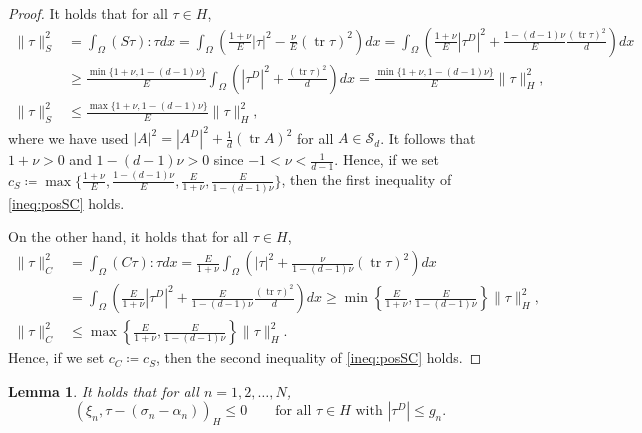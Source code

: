 \documentclass[11pt, a4paper]{article}
\newtheorem{Lem}[Th]{Lemma}
\newcommand{\Sym}{{\mathcal S}}
\newcommand{\tr}{\operatorname{tr}}
\newcommand{\defeq}{\coloneqq}
\newcommand{\into}{\int_\Omega}
\newcommand{\Hs}{{H}}
\begin{document}
\begin{proof}
    It holds that for all $\tau\in\Hs$, 
    \begin{align*}
        \|\tau\|_S^2
        &= \into (S\tau):\tau dx 
        = \into \left(\frac{1+\nu}{E}|\tau|^2 - \frac{\nu}{E}(\tr \tau)^2\right) dx
        = \into \left(\frac{1+\nu}{E}|\tau^D|^2 + \frac{1-(d-1)\nu}{E}\frac{(\tr \tau)^2}{d}\right) dx\\
        &\ge \frac{\min\{1+\nu,1-(d-1)\nu\}}{E}\into \left(|\tau^D|^2 + \frac{(\tr \tau)^2}{d}\right) dx
        = \frac{\min\{1+\nu,1-(d-1)\nu\}}{E}\|\tau\|_\Hs^2,\\
        \|\tau\|_S^2
        &\le \frac{\max\{1+\nu,1-(d-1)\nu\}}{E}\|\tau\|_\Hs^2,
    \end{align*}
    where we have used $|A|^2 = |A^D|^2 + \frac{1}{d}(\tr A)^2$ for all $A\in\Sym_d$.
    It follows that $1+\nu > 0$ and $1-(d-1)\nu > 0$ since $-1<\nu<\frac{1}{d-1}$. Hence, if we set $c_S\defeq\max\{\frac{1+\nu}{E}, \frac{1-(d-1)\nu}{E}, \frac{E}{1+\nu}, \frac{E}{1-(d-1)\nu}\}$, then the first inequality of \eqref{ineq:posSC} holds.

    On the other hand, it holds that for all $\tau\in\Hs$,
    \begin{align*}
        \|\tau\|_C^2
        &= \into (C\tau):\tau dx 
        = \frac{E}{1+\nu}\into \left(|\tau|^2 + \frac{\nu}{1-(d-1)\nu}(\tr \tau)^2\right) dx \\ 
        &= \into \left(\frac{E}{1+\nu}|\tau^D|^2 + \frac{E}{1-(d-1)\nu}\frac{(\tr \tau)^2}{d}\right) dx 
        \ge \min\left\{\frac{E}{1+\nu},\frac{E}{1-(d-1)\nu}\right\}\|\tau\|_\Hs^2,\\
        \|\tau\|_C^2
        &\le \max\left\{\frac{E}{1+\nu},\frac{E}{1-(d-1)\nu}\right\}\|\tau\|_\Hs^2.
    \end{align*}
    Hence, if we set $c_C\defeq c_S$, then the second inequality of \eqref{ineq:posSC} holds.
\end{proof}

\begin{Lem}\label{Lem:Sineq}
    It holds that for all $n=1,2,\ldots,N$,
	\[
		(\xi_n, \tau - (\sigma_n-\alpha_n))_\Hs \le 0
		\qquad\mbox{for all }\tau\in\Hs\mbox{ with }|\tau^D|\le g_n.
	\]
\end{Lem}
\end{document}
